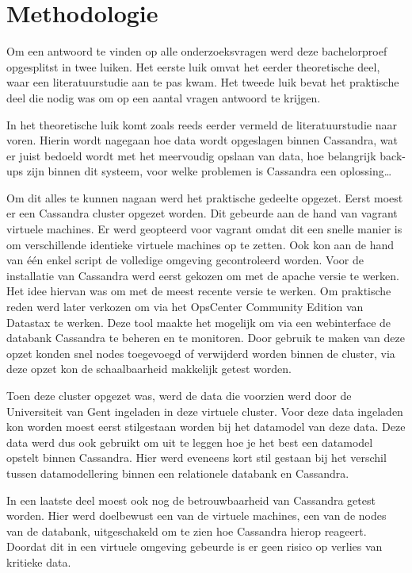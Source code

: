 \chapter{Methodologie}
\label{ch:methodologie}


Om een antwoord te vinden op alle onderzoeksvragen werd deze bachelorproef opgesplitst in twee luiken.
Het eerste luik omvat het eerder theoretische deel, waar een literatuurstudie aan te pas kwam.
Het tweede luik bevat het praktische deel die nodig was om op een aantal vragen antwoord te krijgen.

In het theoretische luik komt zoals reeds eerder vermeld de literatuurstudie naar voren.
Hierin wordt nagegaan hoe data wordt opgeslagen binnen Cassandra, wat er juist bedoeld wordt met het meervoudig opslaan van data, hoe belangrijk back-ups zijn binnen dit systeem, voor welke problemen is Cassandra een oplossing\dots

Om dit alles te kunnen nagaan werd het praktische gedeelte opgezet.
Eerst moest er een Cassandra cluster opgezet worden.
Dit gebeurde aan de hand van vagrant virtuele machines.
Er werd geopteerd voor vagrant omdat dit een snelle manier is om verschillende identieke virtuele machines op te zetten.
Ook kon aan de hand van één enkel script de volledige omgeving gecontroleerd worden.
Voor de installatie van Cassandra werd eerst gekozen om met de apache versie te werken.
Het idee hiervan was om met de meest recente versie te werken.
Om praktische reden werd later verkozen om via het OpsCenter Community Edition van Datastax te werken.
Deze tool maakte het mogelijk om via een webinterface de databank Cassandra te beheren en te monitoren.
Door gebruik te maken van deze opzet konden snel nodes toegevoegd of verwijderd worden binnen de cluster, via deze opzet kon de schaalbaarheid makkelijk getest worden.

Toen deze cluster opgezet was, werd de data die voorzien werd door de Universiteit van Gent ingeladen in deze virtuele cluster.
Voor deze data ingeladen kon worden moest eerst stilgestaan worden bij het datamodel van deze data.
Deze data werd dus ook gebruikt om uit te leggen hoe je het best een datamodel opstelt binnen Cassandra.
Hier werd eveneens kort stil gestaan bij het verschil tussen datamodellering binnen een relationele databank en Cassandra. 

In een laatste deel moest ook nog de betrouwbaarheid van Cassandra getest worden.
Hier werd doelbewust een van de virtuele machines, een van de nodes van de databank, uitgeschakeld om te zien hoe Cassandra hierop reageert.
Doordat dit in een virtuele omgeving gebeurde is er geen risico op verlies van kritieke data.